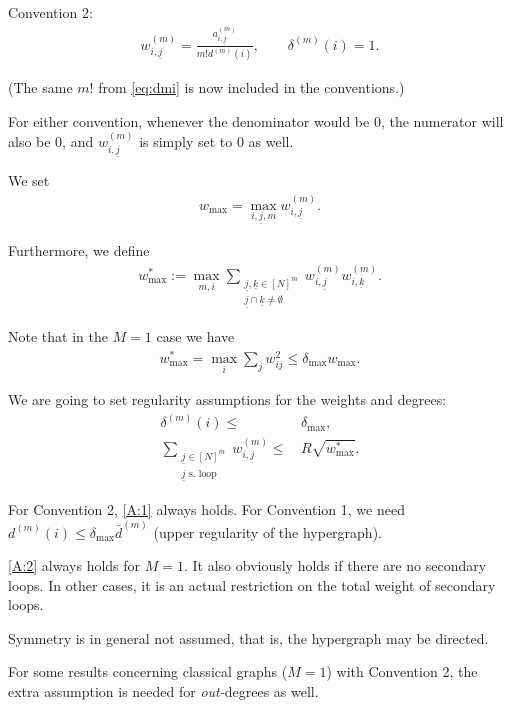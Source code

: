 \documentclass{article}
\newcommand{\ul}{\underline}
\newcommand{\1}[1]{{\mathds{1}}_{\left\{#1\right\}}}
\newcommand{\remm}[1]{{#1}}
\begin{document}
	Convention 2:
	\begin{align}
		\label{eq:conv2}
		w_{i,\underline{j}}^{(m)}=\frac{a_{i,\underline{j}}^{(m)}}{m! d^{(m)}(i)}, \qquad
		\delta^{(m)}(i)=1.
	\end{align}
	
	(The same $m!$ from \eqref{eq:dmi} is now included in the conventions.)
	
	For either convention, whenever the denominator would be 0, the numerator will also be 0, and $w_{i,\underline{j}}^{(m)}$ is simply set to 0 as well.
	
	We set
	\begin{align*}w_{\max}=\max_{i,\ul{j},m}w_{i,\underline{j}}^{(m)}.
	\end{align*}
	
	\remm{
	Furthermore, we define
	\begin{align*}
		w_{\max}^{*}:=\max_{m,i} \sum_{ \substack{\ul{j},\ul{k} \in [N]^m \\ \ul{j} \cap \ul{k} \neq \emptyset }}w_{i,\ul{j}}^{(m)}w_{i,\ul{k}}^{(m)}.
	\end{align*}
	
	Note that in the $M=1$ case we have
	\begin{align*}
		w_{\max}^*= \max_i \sum_{j}w_{ij}^2 \leq \delta_{\max} w_{\max}.
	\end{align*}
	}
	
	
	We are going to set regularity assumptions for the weights and degrees:
	\begin{align}
		\label{A:1}
		\delta^{(m)}(i) \leq&\, \delta_{\max}, \\
		\label{A:2}
		\sum_{\substack{\underline{j} \in [N]^m \\ \underline{j} \textrm{ s. loop} }} w_{i,\underline{j}}^{(m)} \leq&\, R \sqrt{\remm{w_{\max}^{*}}}.
	\end{align}
	
	For Convention 2, \eqref{A:1} always holds. For Convention 1, we need $d^{(m)}(i) \leq \delta_{\max} \bar{d}^{(m)}$ (upper regularity of the hypergraph).
	
	\eqref{A:2} always holds for $M=1$. It also obviously holds if there are no secondary loops. In other cases, it is an actual restriction on the total weight of secondary loops.
	
	Symmetry is in general not assumed, that is, the hypergraph may be directed.

	For some results concerning classical graphs ($M=1$) with Convention 2, the extra assumption is needed for \emph{out-}degrees as well.
	
\end{document}

